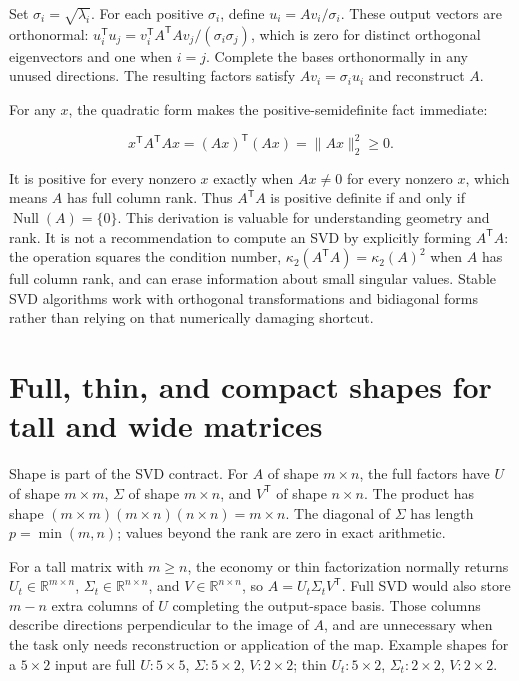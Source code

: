 Set \(\sigma_i=\sqrt{\lambda_i}\). For each positive \(\sigma_i\), define \(u_i=Av_i/\sigma_i\). These output vectors are orthonormal: \(u_i^\mathsf T u_j=v_i^\mathsf T A^\mathsf T A v_j/(\sigma_i\sigma_j)\), which is zero for distinct orthogonal eigenvectors and one when \(i=j\). Complete the bases orthonormally in any unused directions. The resulting factors satisfy \(Av_i=\sigma_i u_i\) and reconstruct \(A\).

For any \(x\), the quadratic form makes the positive-semidefinite fact immediate:

\[
x^\mathsf T A^\mathsf T A x=(Ax)^\mathsf T(Ax)=\|Ax\|_2^2\ge0.
\]

It is positive for every nonzero \(x\) exactly when \(Ax\ne0\) for every nonzero \(x\), which means \(A\) has full column rank. Thus \(A^\mathsf T A\) is positive definite if and only if \(\operatorname{Null}(A)=\{0\}\). This derivation is valuable for understanding geometry and rank. It is not a recommendation to compute an SVD by explicitly forming \(A^\mathsf T A\): the operation squares the condition number, \(\kappa_2(A^\mathsf T A)=\kappa_2(A)^2\) when \(A\) has full column rank, and can erase information about small singular values. Stable SVD algorithms work with orthogonal transformations and bidiagonal forms rather than relying on that numerically damaging shortcut.

\section{Full, thin, and compact shapes for tall and wide matrices}\label{02-foundations-ii-ch024-full-thin-and-compact-shapes-for-tall-and-wide-matrices}

Shape is part of the SVD contract. For \(A\) of shape \(m\times n\), the full factors have \(U\) of shape \(m\times m\), \(\Sigma\) of shape \(m\times n\), and \(V^\mathsf T\) of shape \(n\times n\). The product has shape \((m\times m)(m\times n)(n\times n)=m\times n\). The diagonal of \(\Sigma\) has length \(p=\min(m,n)\); values beyond the rank are zero in exact arithmetic.

For a tall matrix with \(m\ge n\), the economy or thin factorization normally returns \(U_t\in\mathbb R^{m\times n}\), \(\Sigma_t\in\mathbb R^{n\times n}\), and \(V\in\mathbb R^{n\times n}\), so \(A=U_t\Sigma_tV^\mathsf T\). Full SVD would also store \(m-n\) extra columns of \(U\) completing the output-space basis. Those columns describe directions perpendicular to the image of \(A\), and are unnecessary when the task only needs reconstruction or application of the map. Example shapes for a \(5\times2\) input are full \(U:5\times5\), \(\Sigma:5\times2\), \(V:2\times2\); thin \(U_t:5\times2\), \(\Sigma_t:2\times2\), \(V:2\times2\).

